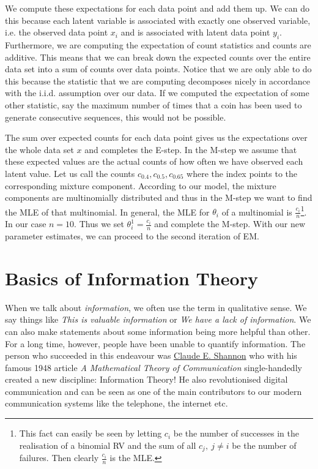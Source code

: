 We compute these expectations for each data point and add them up. We can do this because each latent 
variable is associated with exactly one observed variable, i.e. the observed data point $ x_{i} $ and
is associated with latent data point $ y_{i} $. Furthermore, we are computing the expectation of count
statistics and counts are additive. This means that we can break down the expected counts over the
entire data set into a sum of counts over data points. Notice that we are only able to do this because
the statistic that we are computing decomposes nicely in accordance with the i.i.d. assumption over
our data. If we computed the expectation of some other statistic, say the maximum number of times 
that a coin has been used to generate consecutive sequences, this would not be possible. 

The sum over expected counts for each data point gives us the expectations over the whole data set $ x $ and completes the E-step.
In the M-step we assume that these expected values are the actual counts of how often we have observed each latent value. Let us call the counts 
$ c_{0.4}, c_{0.5}, c_{0.65} $ where the index points to the corresponding mixture component. According to our model, the mixture components are multinomially
distributed and thus in the M-step we want to find the MLE of that multinomial. In general, the MLE for $ \theta_{i} $ of a multinomial is
$ \frac{c_{i}}{n} $\footnote{This fact can easily be seen by letting $ c_{i} $ be the number of successes in the realisation of a binomial RV and the sum of all
$ c_{j},~j \not = i $ be the number of failures. Then clearly $ \frac{c_{i}}{n} $ is the MLE.}. In our case $ n=10 $. Thus we set 
$ \theta_{i}^{1} = \frac{c_{i}}{n} $ and complete the M-step. With our new parameter estimates, we can proceed to the second iteration of EM.

\section{Basics of Information Theory}

When we talk about \textit{information}, we often use the term in qualitative sense. We say things like 
\textit{This is valuable information} or 
\textit{We have a lack of information}. We can also make statements about some information being more helpful than other. For a long time, however,
people have been unable to quantify information. The person who succeeded in this endeavour was \href{https://en.wikipedia.org/wiki/Claude_Shannon}{Claude E. Shannon}
who with his famous 1948 article \textit{A Mathematical Theory of Communication} single-handedly created a new discipline: Information Theory! He also revolutionised
digital communication and can be seen as one of the main contributors to our modern communication systems like the telephone, the internet etc. 

